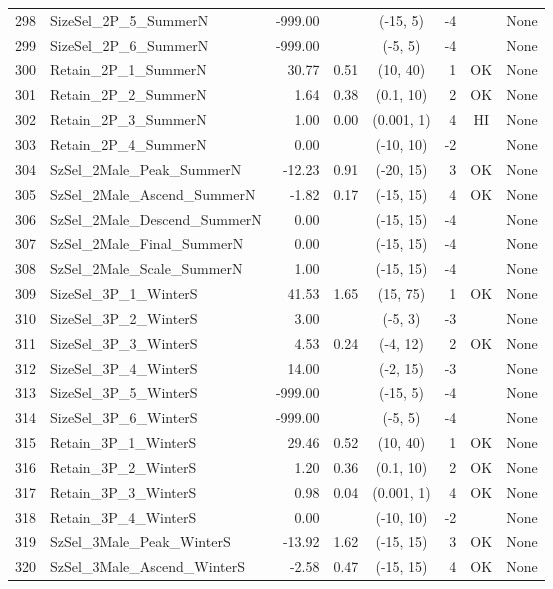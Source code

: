\documentclass[12pt,]{article}
\begin{document}
\begin{landscape}
\begin{longtable}{rlrrcrcl}
  298 & SizeSel\_2P\_5\_SummerN & -999.00 &  & (-15, 5) & -4 &  & None \\ 
  299 & SizeSel\_2P\_6\_SummerN & -999.00 &  & (-5, 5) & -4 &  & None \\ 
  300 & Retain\_2P\_1\_SummerN & 30.77 & 0.51 & (10, 40) & 1 & OK & None \\ 
  301 & Retain\_2P\_2\_SummerN & 1.64 & 0.38 & (0.1, 10) & 2 & OK & None \\ 
  302 & Retain\_2P\_3\_SummerN & 1.00 & 0.00 & (0.001, 1) & 4 & HI & None \\ 
  303 & Retain\_2P\_4\_SummerN & 0.00 &  & (-10, 10) & -2 &  & None \\ 
  304 & SzSel\_2Male\_Peak\_SummerN & -12.23 & 0.91 & (-20, 15) & 3 & OK & None \\ 
  305 & SzSel\_2Male\_Ascend\_SummerN & -1.82 & 0.17 & (-15, 15) & 4 & OK & None \\ 
  306 & SzSel\_2Male\_Descend\_SummerN & 0.00 &  & (-15, 15) & -4 &  & None \\ 
  307 & SzSel\_2Male\_Final\_SummerN & 0.00 &  & (-15, 15) & -4 &  & None \\ 
  308 & SzSel\_2Male\_Scale\_SummerN & 1.00 &  & (-15, 15) & -4 &  & None \\ 
  309 & SizeSel\_3P\_1\_WinterS & 41.53 & 1.65 & (15, 75) & 1 & OK & None \\ 
  310 & SizeSel\_3P\_2\_WinterS & 3.00 &  & (-5, 3) & -3 &  & None \\ 
  311 & SizeSel\_3P\_3\_WinterS & 4.53 & 0.24 & (-4, 12) & 2 & OK & None \\ 
  312 & SizeSel\_3P\_4\_WinterS & 14.00 &  & (-2, 15) & -3 &  & None \\ 
  313 & SizeSel\_3P\_5\_WinterS & -999.00 &  & (-15, 5) & -4 &  & None \\ 
  314 & SizeSel\_3P\_6\_WinterS & -999.00 &  & (-5, 5) & -4 &  & None \\ 
  315 & Retain\_3P\_1\_WinterS & 29.46 & 0.52 & (10, 40) & 1 & OK & None \\ 
  316 & Retain\_3P\_2\_WinterS & 1.20 & 0.36 & (0.1, 10) & 2 & OK & None \\ 
  317 & Retain\_3P\_3\_WinterS & 0.98 & 0.04 & (0.001, 1) & 4 & OK & None \\ 
  318 & Retain\_3P\_4\_WinterS & 0.00 &  & (-10, 10) & -2 &  & None \\ 
  319 & SzSel\_3Male\_Peak\_WinterS & -13.92 & 1.62 & (-15, 15) & 3 & OK & None \\ 
  320 & SzSel\_3Male\_Ascend\_WinterS & -2.58 & 0.47 & (-15, 15) & 4 & OK & None \\ 

\end{longtable}
\end{landscape}
\end{document}
